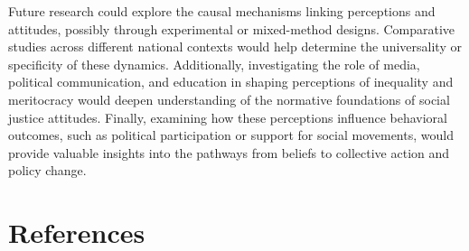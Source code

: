 \documentclass[
  12pt,
]{article}
\begin{document}
Future research could explore the causal mechanisms linking perceptions
and attitudes, possibly through experimental or mixed-method designs.
Comparative studies across different national contexts would help
determine the universality or specificity of these dynamics.
Additionally, investigating the role of media, political communication,
and education in shaping perceptions of inequality and meritocracy would
deepen understanding of the normative foundations of social justice
attitudes. Finally, examining how these perceptions influence behavioral
outcomes, such as political participation or support for social
movements, would provide valuable insights into the pathways from
beliefs to collective action and policy change.

\section{References}\label{references}
\end{document}
